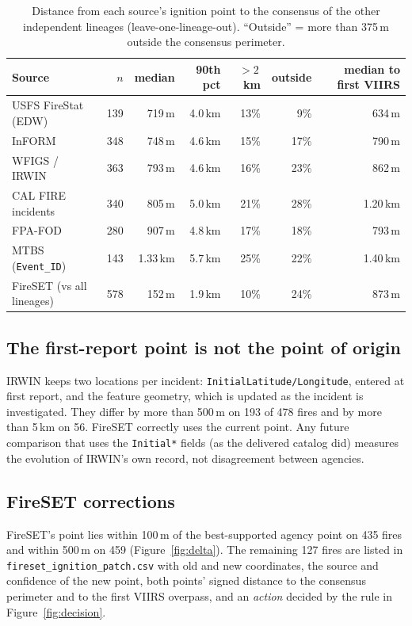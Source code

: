 \documentclass[11pt,a4paper]{article}
\begin{document}
\begin{table}[h]
\centering\small
\caption{Distance from each source's ignition point to the consensus of the other independent lineages
(leave-one-lineage-out). ``Outside'' = more than 375\,m outside the consensus perimeter.}
\label{tab:ignerr}
\begin{tabular}{@{}lrrrrrr@{}}
\toprule
Source & $n$ & median & 90th pct & $>2$\,km & outside & median to first VIIRS\\
\midrule
USFS FireStat (EDW) & 139 & 719\,m & 4.0\,km & 13\% & 9\% & 634\,m\\
InFORM & 348 & 748\,m & 4.6\,km & 15\% & 17\% & 790\,m\\
WFIGS / IRWIN & 363 & 793\,m & 4.6\,km & 16\% & 23\% & 862\,m\\
CAL FIRE incidents & 340 & 805\,m & 5.0\,km & 21\% & 28\% & 1.20\,km\\
FPA-FOD & 280 & 907\,m & 4.8\,km & 17\% & 18\% & 793\,m\\
MTBS (\texttt{Event\_ID}) & 143 & 1.33\,km & 5.7\,km & 25\% & 22\% & 1.40\,km\\
\midrule
FireSET (vs all lineages) & 578 & 152\,m & 1.9\,km & 10\% & 24\% & 873\,m\\
\bottomrule
\end{tabular}
\end{table}

\subsection{The first-report point is not the point of origin}

IRWIN keeps two locations per incident: \texttt{InitialLatitude/Longitude}, entered at first report, and the
feature geometry, which is updated as the incident is investigated. They differ by more than 500\,m on 193 of
478 fires and by more than 5\,km on 56. FireSET correctly uses the current point. Any future comparison that
uses the \texttt{Initial*} fields (as the delivered catalog did) measures the evolution of IRWIN's own record,
not disagreement between agencies.

\subsection{FireSET corrections}
\label{sec:patch}

FireSET's point lies within 100\,m of the best-supported agency point on 435 fires and within 500\,m on 459
(Figure~\ref{fig:delta}). The remaining 127 fires are listed in \texttt{fireset\_ignition\_patch.csv}
with old and new coordinates, the source and confidence of the new point, both points' signed distance to the
consensus perimeter and to the first VIIRS overpass, and an \emph{action} decided by the rule in
Figure~\ref{fig:decision}.
\end{document}
